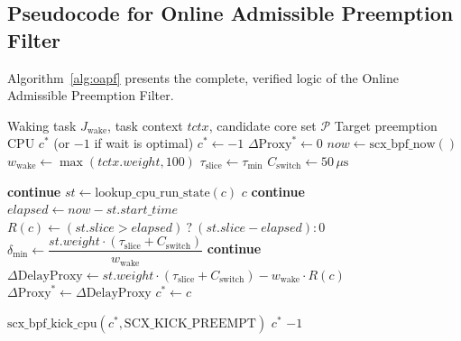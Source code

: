 \documentclass[conference]{IEEEtran}
\begin{document}
\subsection{Pseudocode for Online Admissible Preemption Filter}
Algorithm~\ref{alg:oapf} presents the complete, verified logic of the Online Admissible Preemption Filter.

\begin{algorithm}[t]
\caption{OPTIMA-OAPF (Online Admissible Preemption Filter)}
\label{alg:oapf}
\begin{algorithmic}[1]
\footnotesize
\REQUIRE Waking task $J_{\mathrm{wake}}$, task context $tctx$, candidate core set $\mathcal{P}$
\ENSURE Target preemption CPU $c^*$ (or $-1$ if wait is optimal)
\STATE $c^* \leftarrow -1$
\STATE $\Delta\mathrm{Proxy}^* \leftarrow 0$ 
\STATE $now \leftarrow \text{scx\_bpf\_now}()$
\STATE $w_{\mathrm{wake}} \leftarrow \max(tctx.weight, 100)$
\STATE $\tau_{\mathrm{slice}} \leftarrow \tau_{\min}$ 
\STATE $C_{\mathrm{switch}} \leftarrow 50\,\mu\text{s}$ 

        \STATE \textbf{continue}
    \ENDIF
    \STATE $st \leftarrow \text{lookup\_cpu\_run\_state}(c)$
        \RETURN $c$ 
    \ENDIF
        \STATE \textbf{continue} 
    \ENDIF
    \STATE $elapsed \leftarrow now - st.start\_time$
    \STATE $R(c) \leftarrow (st.slice > elapsed) \ ? \ (st.slice - elapsed) : 0$
    \STATE $\delta_{\min} \leftarrow \dfrac{st.weight \cdot (\tau_{\mathrm{slice}} + C_{\mathrm{switch}})}{w_{\mathrm{wake}}}$
        \STATE \textbf{continue} 
    \ENDIF
    \STATE $\Delta\mathrm{DelayProxy} \leftarrow st.weight \cdot (\tau_{\mathrm{slice}} + C_{\mathrm{switch}}) - w_{\mathrm{wake}} \cdot R(c)$
        \STATE $\Delta\mathrm{Proxy}^* \leftarrow \Delta\mathrm{DelayProxy}$
        \STATE $c^* \leftarrow c$
    \ENDIF
\ENDFOR

    \STATE $\text{scx\_bpf\_kick\_cpu}(c^*, \text{SCX\_KICK\_PREEMPT})$
    \RETURN $c^*$
\ENDIF
\RETURN $-1$ 
\end{algorithmic}
\end{algorithm}
\end{document}

